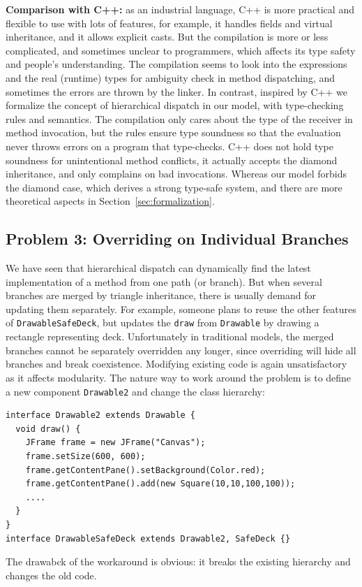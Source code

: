 \noindent\textbf{Comparison with C++:} as an industrial language, C++ is more practical and flexible to use with lots of features, for example, it handles fields and virtual inheritance, and it allows explicit casts. But the compilation is more or less complicated, and sometimes unclear to programmers, which affects its type safety and people's understanding. The compilation seems to look into the expressions and the real (runtime) types for ambiguity check in method dispatching, and sometimes the errors are thrown by the linker. In contrast, inspired by C++ we formalize the concept of hierarchical dispatch in our model, with type-checking rules and semantics. The compilation only cares about the type of the receiver in method invocation, but the rules ensure type soundness so that the evaluation never throws errors on a program that type-checks. C++ does not hold type soundness for unintentional method conflicts, it actually accepts the diamond inheritance, and only complains on bad invocations. Whereas our model forbids the diamond case, which derives a strong type-safe system, and there are more theoretical aspects in Section~\ref{sec:formalization}. 


\subsection{Problem 3: Overriding on Individual Branches}\label{subsec:partialoverrides}
We have seen that hierarchical dispatch can dynamically find the latest implementation of a method from one path (or branch). But when
several branches are merged by triangle inheritance, there is usually demand for updating them separately. For example, someone plans to
reuse the other features of \lstinline|DrawableSafeDeck|, but updates the \lstinline|draw| from \lstinline|Drawable| by drawing a rectangle representing deck. Unfortunately in traditional models, the merged branches cannot be separately overridden any longer, since overriding
will hide all branches and break coexistence. Modifying existing code is again unsatisfactory as it affects modularity. The nature way to work around the problem is to define a new component \lstinline|Drawable2| and change the class hierarchy:
\begin{lstlisting}
interface Drawable2 extends Drawable {
  void draw() {
    JFrame frame = new JFrame("Canvas");
    frame.setSize(600, 600);
    frame.getContentPane().setBackground(Color.red);
    frame.getContentPane().add(new Square(10,10,100,100));
    ....
  }
}
interface DrawableSafeDeck extends Drawable2, SafeDeck {}
\end{lstlisting} 
The drawabck of the workaround is obvious: it breaks the existing hierarchy and changes the old code.

